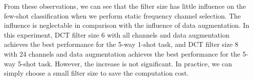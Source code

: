 \documentclass[10pt, conference, compsocconf]{IEEEtran}
\begin{document}
From these observations, we can see that the filter size has little influence on the few-shot classification when we perform static frequency channel selection. The influence is neglectable in comparison with the influence of data augmentation. In this experiment, DCT filter size 6 with all channels and data augmentation achieves the best performance for the 5-way 1-shot task, and DCT filter size 8 with 24 channels and data augmentation achieves the best performance for the 5-way 5-shot task. However, the increase is not significant. In practice, we can simply choose a small filter size to save the computation cost.

\begin{comment}
According to Talbe \ref{table3}, all baseline++ (f) methods outperform their corresponding baseline++ (s) version without the DCT module, even when the DCT filter size is as small as 22. 

This result provides the possibility for other tasks like object detection and tracking. we can also choose a small filter size to save computation for computation-sensitive tasks, like mobile applications.

In addition, 
When all frequency channels are employed, we find the accuracy is increased with the size of the DCT filter no matter whether we add data augmentation or not during the training phase for the 5-way 1-shot classification task. However, for 5-way 5-shot task, the rule is subtle, since the baseline++ (f) with  outperforms other filter sizes when there is no data augmentation and baseline++ (f) with  is better than other baseline++ (f) versions with data augmentation. On the other hand, when we select the top left 24 frequency channels, the accuracy gets increased when no data augmentation is added, while baseline++ (f) with  beats all other baseline++ (f) with DCT filter size 4 and 6. When we select 24 top left square channels, classification accuracy varies in a small range for both 5-way 1-shot and 5-way 5-shot tasks with/without data augmentation. From these observations, filter size has little influence on few-shot classification when we perform static frequency channel selection. This also happens when we remove data augmentation. However, data augmentation and DCT with different filter sizes increase performance significantly when they function together, from 1.31 to 2.5 for a 5-shot 1-way task if we use all frequency channels. This indicates we may have different channel selection rules for different filter sizes to achieve better performance. In all the following experiments of this paper, we all use  DCT filter with the top left 24 selected frequency channels and data augmentation when it comes to (f) version for convenience.
\end{comment}
\end{document}
